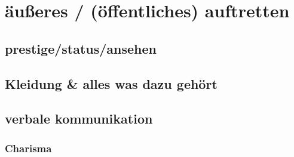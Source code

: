 %
%

\part{äußeres / (öffentliches) auftretten}
    \chapter{prestige/status/ansehen}
     
    \chapter{Kleidung & alles was dazu gehört}

    \chapter{verbale kommunikation}
        \section{Charisma}
